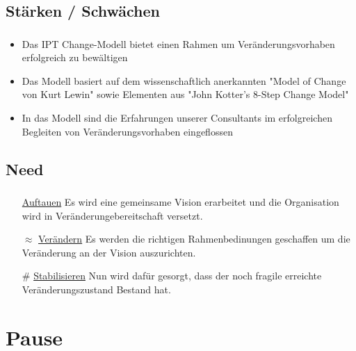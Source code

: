 \documentclass[aspectratio=169]{beamer}
\begin{document}
\subsection{Stärken / Schwächen}
\begin{frame}
\frametitle{\subsecname\hfill{}}

\begin{itemize}[label={$\bullet$}]
\item Das IPT Change-Modell bietet einen Rahmen um Veränderungsvorhaben erfolgreich zu bewältigen
\item Das Modell basiert auf dem wissenschaftlich anerkannten "Model of Change von Kurt Lewin" sowie Elementen aus "John Kotter's 8-Step Change Model"
\item In das Modell sind die Erfahrungen unserer Consultants im erfolgreichen Begleiten von Veränderungsvorhaben eingeflossen
\end{itemize}
\end{frame}

\subsection{Need}
\begin{frame}
\frametitle{\subsecname}\framesubtitle{\secname}
\begin{itemize}
\setlength\itemsep{1em}
\item[\color{ice-blue}\SnowflakeChevron]\underline{Auftauen}\newline
Es wird eine gemeinsame Vision erarbeitet und die Organisation wird in Veränderungebereitschaft versetzt.
\item[\color{ipt-red}\selectfont$\approx$]\underline{Verändern}\newline
Es werden die richtigen Rahmenbedinungen geschaffen um die Veränderung an der Vision auszurichten.
\item[\selectfont\color{ipt-blue}\#]\underline{Stabilisieren}\newline
Nun wird dafür gesorgt, dass der noch fragile erreichte Veränderungszustand Bestand hat.
\end{itemize}
\end{frame}


\section{Pause}
\end{document}
